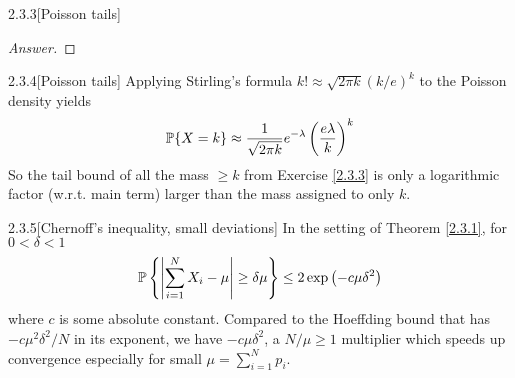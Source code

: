 {\begin{ex}{2.3.3}[Poisson tails]
\begin{proof}[Answer]
\end{proof}
\end{ex}

\begin{rmk}{2.3.4}[Poisson tails]\label{2.3.4}
Applying Stirling's formula $k! \approx \sqrt{2\pi k}(k/e)^k$ to the Poisson density yields
\begin{align*}
    \mathbb{P} \{X = k\} \approx \frac 1 {\sqrt{2 \pi k}} e^{-\lambda} \left(\frac{e \lambda}k \right)^k
\end{align*}
So the tail bound of all the mass $\geq k$ from Exercise \ref{2.3.3} is only a logarithmic factor (w.r.t. main term) larger than the mass assigned to only $k$.
\end{rmk}

\begin{ex}{2.3.5}[Chernoff's inequality, small deviations]\label{2.3.5}
In the setting of Theorem \ref{2.3.1}, for $0 < \delta < 1$
\begin{align*}
    \mathbb{P} \left\{\left| \sum_{i=1}^N X_i - \mu\right| \geq \delta\mu\right\} \leq 2\exp\left(-c\mu\delta^2\right)
\end{align*}
where $c$ is some absolute constant. Compared to the Hoeffding bound that has $-c\mu^2\delta^2/N$ in its exponent, we have $-c\mu\delta^2$, a $N/\mu \geq 1$ multiplier which speeds up convergence especially for small $\mu = \sum_{i=1}^N p_i$. 
\end{ex}

}
